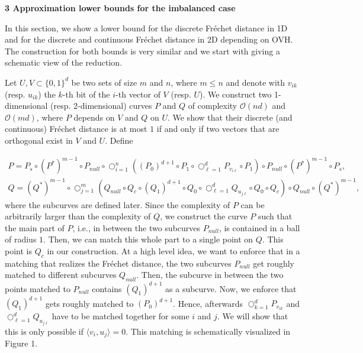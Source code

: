 \par\medskip\noindent\textbf{3 Approximation lower bounds for the imbalanced case}\par
In this section, we show a lower bound for the discrete Fréchet distance in 1D and for the discrete and continuous Fréchet distance in 2D depending on OVH. The construction for both bounds is very similar and we start with giving a schematic view of the reduction.
\par
\par
Let $U,V\subset\{0,1\}^{d}$ be two sets of size $m$ and $n$, where $m\leq n$ and denote with $v_{ik}$ (resp. $u_{ik}$) the $k$-th bit of the $i$-th vector of $V$ (resp. $U$). We construct two 1-dimensional (resp. 2-dimensional) curves $P$ and $Q$ of complexity $\mathcal{O}(nd)$ and $\mathcal{O}(md)$, where $P$ depends on $V$ and $Q$ on $U$. We show that their discrete (and continuous) Fréchet distance is at most $1$ if and only if two vectors that are orthogonal exist in $V$ and $U$. Define
\par
\[\begin{aligned}
P=P_{s}\circ(P^{*})^{m-1}\circ P_{null}\circ\bigcirc_{i=1}^{n}\left((P_{0})^{d%
+1}\circ P_{1}\circ\bigcirc_{\ell=1}^{d}P_{v_{i\ell}}\circ P_{1}\right)\circ P%
_{null}\circ(P^{*})^{m-1}\circ P_{s},
\end{aligned}\]
\[\begin{aligned}
Q=(Q^{*})^{m-1}\circ\bigcirc_{j=1}^{m}\left(Q_{null}\circ Q_{c}\circ(Q_{1})^{d%
+1}\circ Q_{0}\circ\bigcirc_{\ell=1}^{d}Q_{u_{j\ell}}\circ Q_{0}\circ Q_{c}%
\right)\circ Q_{null}\circ(Q^{*})^{m-1},
\end{aligned}\]
where the subcurves are defined later. Since the complexity of $P$ can be arbitrarily larger than the complexity of $Q$, we construct the curve $P$ such that the main part of $P$, i.e., in between the two subcurves $P_{null}$, is contained in a ball of radius $1$. Then, we can match this whole part to a single point on $Q$. This point is $Q_{c}$ in our construction. At a high level idea, we want to enforce that in a matching that realizes the Fréchet distance, the two subcurves $P_{null}$ get roughly matched to different subcurves $Q_{null}$. Then, the subcurve in between the two points matched to $P_{null}$ contains $(Q_{1})^{d+1}$ as a subcurve. Now, we enforce that $(Q_{1})^{d+1}$ gets roughly matched to $(P_{0})^{d+1}$. Hence, afterwards $\bigcirc_{k=1}^{d}P_{v_{ik}}$ and $\bigcirc_{\ell=1}^{d}Q_{u_{j\ell}}$ have to be matched together for some $i$ and $j$. We will show that this is only possible if $\langle v_{i},u_{j}\rangle=0$. This matching is schematically visualized in Figure 1.
